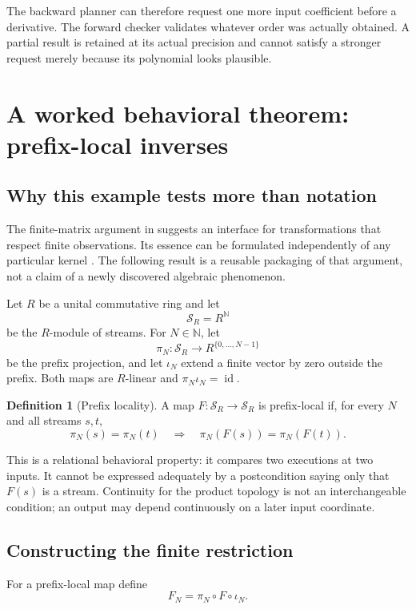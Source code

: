 \documentclass[11pt,a4paper]{article}
\newcommand{\N}{\mathbb N}
\newcommand{\id}{\operatorname{id}}
\theoremstyle{plain}
\theoremstyle{definition}
\newtheorem{definition}[theorem]{Definition}
\begin{document}
The backward planner can therefore request one more input coefficient before a derivative. The forward checker validates whatever order was actually obtained. A partial result is retained at its actual precision and cannot satisfy a stronger request merely because its polynomial looks plausible.

\section{A worked behavioral theorem: prefix-local inverses}\label{sec:prefix}

\subsection{Why this example tests more than notation}
The finite-matrix argument in  suggests an interface for transformations that respect finite observations. Its essence can be formulated independently of any particular kernel \cite{triangular}. The following result is a reusable packaging of that argument, not a claim of a newly discovered algebraic phenomenon.

Let $R$ be a unital commutative ring and let
\[
 \mathcal S_R=R^{\N}
\]
be the $R$-module of streams. For $N\in\N$, let
\[
 \pi_N:\mathcal S_R\to R^{\{0,\ldots,N-1\}}
\]
be the prefix projection, and let $\iota_N$ extend a finite vector by zero outside the prefix. Both maps are $R$-linear and $\pi_N\iota_N=\id$.

\begin{definition}[Prefix locality]
A map $F:\mathcal S_R\to\mathcal S_R$ is prefix-local if, for every $N$ and all streams $s,t$,
\[
 \pi_N(s)=\pi_N(t)\quad\Longrightarrow\quad
 \pi_N(F(s))=\pi_N(F(t)).
\]
\end{definition}
This is a relational behavioral property: it compares two executions at two inputs. It cannot be expressed adequately by a postcondition saying only that $F(s)$ is a stream. Continuity for the product topology is not an interchangeable condition; an output may depend continuously on a later input coordinate.

\subsection{Constructing the finite restriction}
For a prefix-local map define
\[
 F_N=\pi_N\circ F\circ\iota_N.
\]
\end{document}
